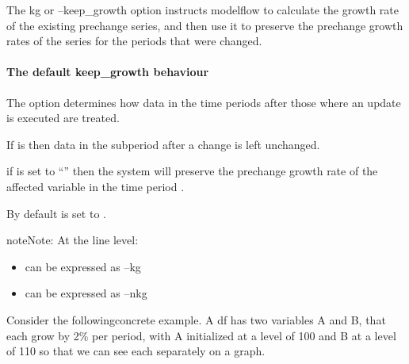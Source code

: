 \documentclass[letterpaper,10pt,english]{jupyterBook}
\begin{document}
\sphinxAtStartPar
The \sphinxhyphen{}kg or –keep\_growth option instructs modelflow to calculate the growth rate of the existing pre\sphinxhyphen{}change series, and then use it to preserve the pre\sphinxhyphen{}change growth rates of the series for the periods that were  changed.


\paragraph{The default keep\_growth behaviour}
\label{\detokenize{content/04_PythonEssentials/UpdateCommand:the-default-keep-growth-behaviour}}
\sphinxAtStartPar
The  option determines how data in  the time periods after those where an update is executed are treated.

\sphinxAtStartPar
If  is  then data in the sub\sphinxhyphen{}period after a change is left unchanged.

\sphinxAtStartPar
if  is set to “” then the system will preserve the pre\sphinxhyphen{}change growth rate of the affected variable in the time period .

\sphinxAtStartPar
By default  is set to .

\begin{sphinxadmonition}{note}{Note:}
\sphinxAtStartPar
At the line level:
\begin{itemize}
\item {} 
\sphinxAtStartPar
{} can be expressed as –kg

\item {} 
\sphinxAtStartPar
{} can be expressed as –nkg

\end{itemize}
\end{sphinxadmonition}

\sphinxAtStartPar
Consider the followingconcrete example. A  df has two variables A and B, that each grow by 2\% per period, with A initialized at a level of 100 and B at a level of 110 so that we can see each separately on a graph.
\end{document}
